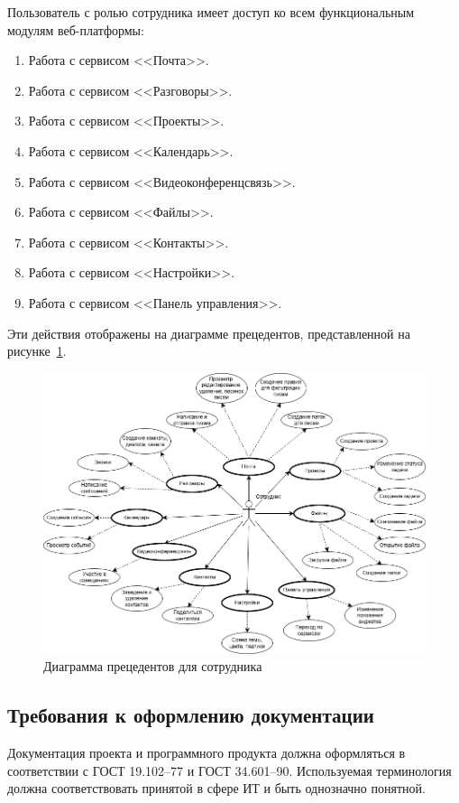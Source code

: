 Пользователь с ролью сотрудника имеет доступ ко всем функциональным модулям веб-платформы:
\begin{enumerate}
  \item Работа с сервисом <<Почта>>.
  \item Работа с сервисом <<Разговоры>>.
  \item Работа с сервисом <<Проекты>>.
  \item Работа с сервисом <<Календарь>>.
  \item Работа с сервисом <<Видеоконференцсвязь>>.
  \item Работа с сервисом <<Файлы>>.
  \item Работа с сервисом <<Контакты>>.
  \item Работа с сервисом <<Настройки>>.
  \item Работа с сервисом <<Панель управления>>.
\end{enumerate}
Эти действия отображены на диаграмме прецедентов, представленной на рисунке~\ref{templ:actor1}.
\begin{figure}[H]
	\centering
	\includegraphics[width=1\linewidth]{images/umldi}
	\caption{Диаграмма прецедентов для сотрудника}
	\label{templ:actor1}
\end{figure}

\subsection{Требования к оформлению документации}

Документация проекта и программного продукта должна оформляться в соответствии с ГОСТ 19.102–77 и ГОСТ 34.601–90. Используемая терминология должна соответствовать принятой в сфере ИТ и быть однозначно понятной.
